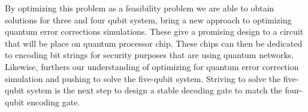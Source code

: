 By optimizing this problem as a feasibility problem we are able to obtain solutions for three and four qubit system, bring a new approach to optimizing quantum error corrections simulations. These give a promising design to a circuit that will be place on quantum processor chip. These chips can then be dedicated to encoding bit strings for security purposes that are using quantum networks. Likewise, furthers our understanding of optimizing for quantum error correction simulation and pushing
to solve the five-qubit system. Striving to solve the five-qubit system is the next step to design a stable decoding gate to match the four-qubit encoding gate. 

